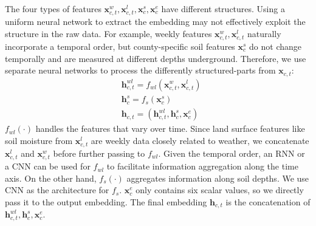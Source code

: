 The four types of features $\mathbf{x}_{c,t}^w, \mathbf{x}_{c,t}^l, \mathbf{x}_{c}^s, \mathbf{x}_{c}^e$ have different structures. Using a uniform neural network to extract the embedding may not effectively exploit the structure in the raw data. For example, weekly features $\mathbf{x}_{c,t}^w, \mathbf{x}_{c,t}^l$ naturally incorporate a temporal order, but county-specific soil features $\mathbf{x}_{c}^s$ do not change temporally and are measured at different depths underground. Therefore, we use separate neural networks to process the differently structured-parts from $\mathbf{x}_{c,t}$:
\begin{equation}
\label{eq:cnn}
\begin{aligned}
&\mathbf{h}_{c,t}^{wl}=f_{wl}(\mathbf{x}_{c,t}^w, \mathbf{x}_{c,t}^l) \\
&\mathbf{h}_{c}^s=f_s(\mathbf{x}_{c}^s) \\
&\mathbf{h}_{c,t}=(\mathbf{h}_{c,t}^{wl}, \mathbf{h}_c^s, \mathbf{x}_{c}^e)
\end{aligned}
\end{equation}
$f_{wl}(\cdot)$ handles the features that vary over time. Since land surface features like soil moisture from $\mathbf{x}_{c,t}^l$ are weekly data closely related to weather, we concatenate $\mathbf{x}_{c,t}^l$ and $\mathbf{x}_{c,t}^w$ before further passing to $f_{wl}$. Given the temporal order, an RNN or a CNN can be used for $f_{wl}$ to facilitate information aggregation along the time axis. On the other hand, $f_s(\cdot)$ aggregates information along soil depths. We use CNN as the architecture for $f_s$. $\mathbf{x}_{c}^e$ only contains six scalar values, so we directly pass it to the output embedding. The final embedding $\mathbf{h}_{c,t}$ is the concatenation of $\mathbf{h}_{c,t}^{wl}, \mathbf{h}_c^s, \mathbf{x}_{c}^e$.


